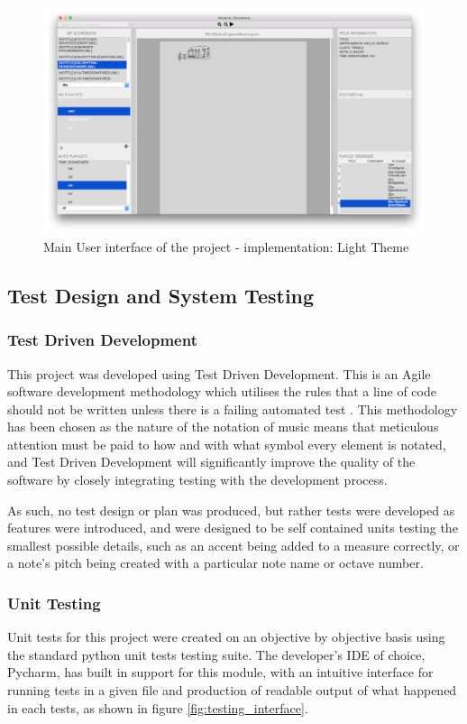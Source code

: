 \begin{figure}[H]
	\centering
    \includegraphics[width=400pt]{designs/main_light.png}
    \caption{Main User interface of the project - implementation: Light Theme}
    \label{fig:main_light}
\end{figure}
\subsection{Test Design and System Testing}
\subsubsection{Test Driven Development}
This project was developed using Test Driven Development. This is an Agile software development methodology which utilises the rules that a line of code should not be written unless there is a failing automated test \parencite{TDD}. This methodology has been chosen as the nature of the notation of music means that meticulous attention must be paid to how and with what symbol every element is notated, and Test Driven Development will significantly improve the quality of the software by closely integrating testing with the development process.

As such, no test design or plan was produced, but rather tests were developed as features were introduced, and were designed to be self contained units testing the smallest possible details, such as an accent being added to a measure correctly, or a note's pitch being created with a particular note name or octave number.

\subsubsection{Unit Testing}
Unit tests for this project were created on an objective by objective basis using the standard python unit tests testing suite. The developer's IDE of choice, Pycharm, has built in support for this module, with an intuitive interface for running tests in a given file and production of readable output of what happened in each tests, as shown in figure \ref{fig:testing_interface}.


